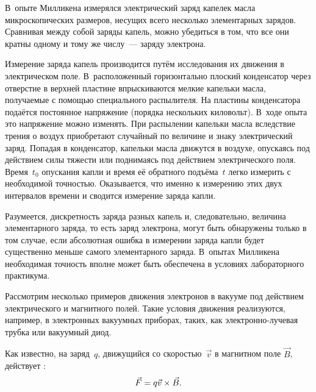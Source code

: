 В~опыте Милликена измерялся электрический заряд капелек масла микроскопических
размеров, несущих всего несколько элементарных зарядов.
Сравнивая между собой заряды капель, можно убедиться в том, что все они кратны
одному и тому же числу~--- заряду электрона.
\todo[inline,color=cyan]{<---}

Измерение заряда капель производится путём исследования их движения в
электрическом поле. В~расположенный горизонтально плоский конденсатор через
отверстие в верхней пластине впрыскиваются мелкие капельки масла, получаемые с
помощью специального распылителя. На пластины конденсатора подаётся постоянное
напряжение (порядка нескольких киловольт). В~ходе опыта это напряжение можно
изменять. При распылении капельки масла вследствие трения о воздух приобретают
случайный по величине и знаку электрический заряд. Попадая в конденсатор,
капельки масла движутся в воздухе, опускаясь под действием силы тяжести или
поднимаясь под действием электрического поля. Время~$t_0$ опускания капли и
время её обратного подъёма~$t$ легко измерить с необходимой точностью.
Оказывается, что именно к измерению этих двух интервалов времени и сводится
измерение заряда капли.

Разумеется, дискретность заряда разных капель и, следовательно, величина
элементарного заряда, то есть заряд электрона, могут быть обнаружены только в
том случае, если абсолютная ошибка в измерении заряда капли будет существенно
меньше самого элементарного заряда. В~опытах Милликена необходимая точность
вполне может быть обеспечена в условиях лабораторного практикума.
\todo[inline,color=cyan]{<---}



Рассмотрим несколько примеров движения электронов в вакууме под действием
электрического и магнитного полей. Такие условия движения реализуются,
например, в электронных вакуумных приборах, таких, как электронно-лучевая
трубка или вакуумный диод.



Как известно, на заряд~$q$, движущийся со скоростью~$\vec{v}$ в магнитном поле
$\vec{B}$, действует :
\begin{equation*}
    \eqmark{3.1}
	\vec{F}=q{\vec{v}}\times{\vec{B}}.
\end{equation*}

